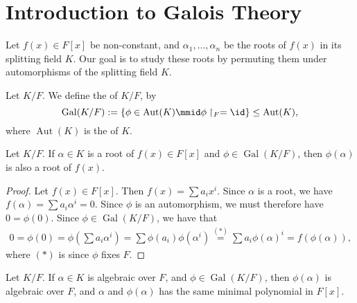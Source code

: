 \documentclass[notoc,notitlepage,nobib]{tufte-book}
\DeclareMathOperator{\Aut}{Aut}
\DeclareMathOperator{\Gal}{Gal}
\begin{document}

\section{Introduction to Galois Theory}%
\label{sec:introduction_to_galois_theory}

Let $f(x) \in F[x]$ be non-constant, and $\alpha_1, \ldots, \alpha_n$ be the
roots of $f(x)$ in its splitting field $K$. Our goal is to study these roots by
permuting them under automorphisms of the splitting field $K$.

\begin{defn}\label{defn:galois_group}
  Let $K / F$. We define the  of $K / F$, by
  \begin{equation*}
    \Gal(K / F) := \left\{ \phi \in \Aut(K) \mmid \phi \restriction_{F} = \id
    \right\} \leq \Aut(K),
  \end{equation*}
  where $\Aut(K)$ is the  of $K$.
\end{defn}

\begin{lemma}\label{lemma:the_galois_group_permutes_roots}
  Let $K / F$. If $\alpha \in K$ is a root of $f(x) \in F[x]$ and $\phi \in
  \Gal(K / F)$, then $\phi(\alpha)$ is also a root of $f(x)$.
\end{lemma}

\begin{proof}
  Let $f(x) \in F[x]$. Then $f(x) = \sum a_i x^i$. Since $\alpha$ is a root, we
  have $f(\alpha) = \sum a_i \alpha^i = 0$. Since $\phi$ is an automorphism, we
  must therefore have $0 = \phi(0)$. Since $\phi \in \Gal(K / F)$, we have that
  \begin{align*}
    0 = \phi(0) = \phi ( \sum a_i \alpha^i ) = \sum \phi(a_i) \phi(\alpha^i)
    \overset{(*)}{=} \sum a_i \phi(\alpha)^i = f(\phi(\alpha)),
  \end{align*}
  where $(*)$ is since $\phi$ fixes $F$.
\end{proof}

\begin{crly}\label{crly:elements_of_the_galois_group_permutes_roots_of_the_same_minimal_polynomial}
  Let $K / F$. If $\alpha \in K$ is algebraic over $F$, and $\phi \in \Gal(K /
  F)$, then $\phi(\alpha)$ is algebraic over $F$, and $\alpha$ and
  $\phi(\alpha)$ has the same minimal polynomial in $F[x]$.
\end{crly}
\end{document}
